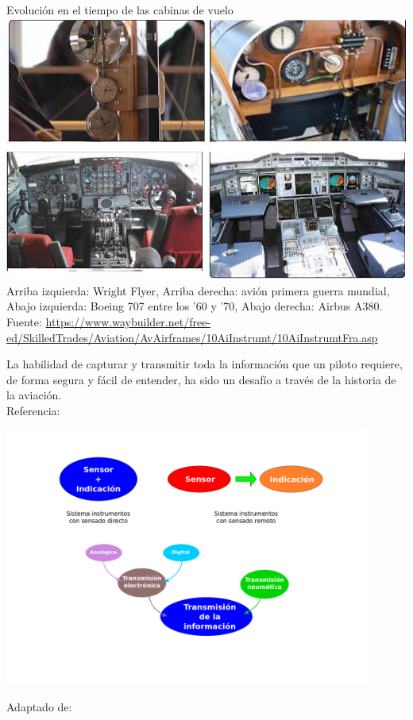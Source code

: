 \begin{frame}{Evoluci\'on en el tiempo de las cabinas de vuelo} \centering
   \includegraphics[height=0.6\linewidth, width=0.9\linewidth]{imagenes/1.1.introduccion/evolucion_cabina.jpg} \\
{\footnotesize Arriba izquierda: Wright Flyer, Arriba derecha: avi\'on primera guerra mundial, \\
Abajo izquierda: Boeing 707 entre los '60 y '70, Abajo derecha: Airbus A380.}\\
{\tiny Fuente: \url{https://www.waybuilder.net/free-ed/SkilledTrades/Aviation/AvAirframes/10AiInstrumt/10AiInstrumtFra.asp}}
\end{frame}

\begin{frame}
  
  \begin{alertblock}{}
    La habilidad de capturar y transmitir toda la informaci\'on que un piloto requiere, de forma segura y f\'acil de entender, ha sido un desaf\'io a trav\'es de la historia de la aviaci\'on.\\
{\tiny Referencia:  \cite{FAA_hdk_aMThA_v2}}
  \end{alertblock}

        \includegraphics[width=0.9\textwidth]{tikz/01_sistema_instrumentos.png}

        {\tiny Adaptado de: \cite{FAA_hdk_aMThA_v2}}

\end{frame}

